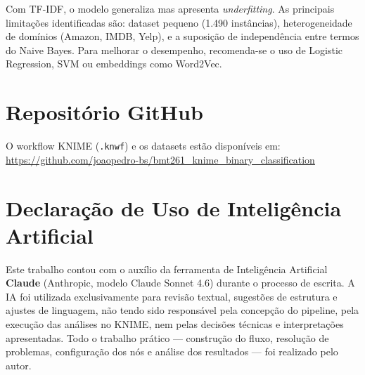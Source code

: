 \documentclass[10pt,twocolumn]{article}
\begin{document}
Com TF-IDF, o modelo generaliza mas apresenta \textit{underfitting}. As principais limitações identificadas são: dataset pequeno (1.490 instâncias), heterogeneidade de domínios (Amazon, IMDB, Yelp), e a suposição de independência entre termos do Naive Bayes. Para melhorar o desempenho, recomenda-se o uso de Logistic Regression, SVM ou embeddings como Word2Vec.

\section*{Repositório GitHub}

O workflow KNIME (\texttt{.knwf}) e os datasets estão disponíveis em:\\
\url{https://github.com/joaopedro-bs/bmt261_knime_binary_classification}

\section*{Declaração de Uso de Inteligência Artificial}

Este trabalho contou com o auxílio da ferramenta de Inteligência Artificial \textbf{Claude} (Anthropic, modelo Claude Sonnet 4.6) durante o processo de escrita. A IA foi utilizada exclusivamente para revisão textual, sugestões de estrutura e ajustes de linguagem, não tendo sido responsável pela concepção do pipeline, pela execução das análises no KNIME, nem pelas decisões técnicas e interpretações apresentadas. Todo o trabalho prático --- construção do fluxo, resolução de problemas, configuração dos nós e análise dos resultados --- foi realizado pelo autor.
\end{document}
